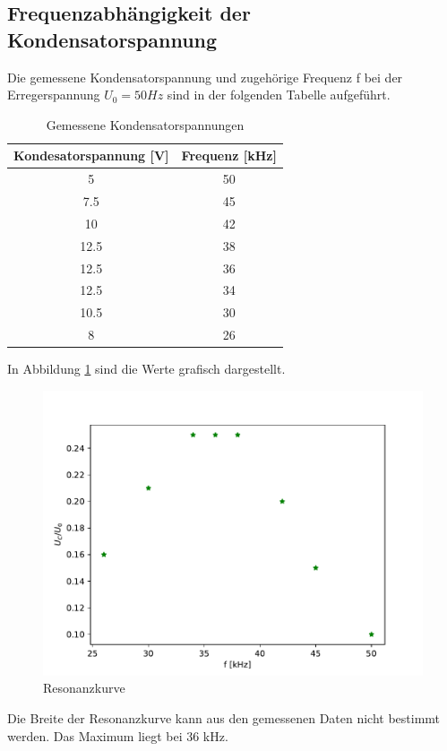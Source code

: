 \subsection{Frequenzabhängigkeit der Kondensatorspannung}
  Die gemessene Kondensatorspannung und zugehörige Frequenz f bei der Erregerspannung
  $U_0 = 50 Hz$ sind in der folgenden Tabelle aufgeführt.
  \begin{table}[H]
    \centering
    \caption{Gemessene Kondensatorspannungen}
    \label{tab:data}
    \begin{tabular}{c c}
      \toprule
      Kondesatorspannung [V] & Frequenz [kHz] \\
      \midrule
      5   & 50 \\
      7.5 & 45 \\
      10  & 42 \\
      12.5& 38 \\
      12.5& 36 \\
      12.5& 34 \\
      10.5& 30 \\
      8   & 26 \\
      \bottomrule
    \end{tabular}
  \end{table}
  In Abbildung \ref{fig:plot2} sind die Werte grafisch dargestellt. 
  \begin{figure}
    \centering
    \includegraphics{Python/plot2.pdf}
    \caption{Resonanzkurve}
    \label{fig:plot2}
  \end{figure}
  Die Breite der Resonanzkurve kann aus den gemessenen Daten nicht bestimmt werden.
  Das Maximum liegt bei 36 kHz. 

